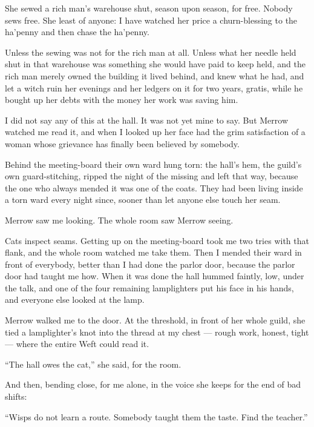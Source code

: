 She sewed a rich man's warehouse shut, season upon season, for free. Nobody sews free. She least of anyone: I have watched her price a churn-blessing to the ha'penny and then chase the ha'penny.

Unless the sewing was not for the rich man at all. Unless what her needle held shut in that warehouse was something she would have paid to keep held, and the rich man merely owned the building it lived behind, and knew what he had, and let a witch ruin her evenings and her ledgers on it for two years, gratis, while he bought up her debts with the money her work was saving him.

I did not say any of this at the hall. It was not yet mine to say. But Merrow watched me read it, and when I looked up her face had the grim satisfaction of a woman whose grievance has finally been believed by somebody.

Behind the meeting-board their own ward hung torn: the hall's hem, the guild's own guard-stitching, ripped the night of the missing and left that way, because the one who always mended it was one of the coats. They had been living inside a torn ward every night since, sooner than let anyone else touch her seam.

Merrow saw me looking. The whole room saw Merrow seeing.

Cats inspect seams. Getting up on the meeting-board took me two tries with that flank, and the whole room watched me take them. Then I mended their ward in front of everybody, better than I had done the parlor door, because the parlor door had taught me how. When it was done the hall hummed faintly, low, under the talk, and one of the four remaining lamplighters put his face in his hands, and everyone else looked at the lamp.

Merrow walked me to the door. At the threshold, in front of her whole guild, she tied a lamplighter's knot into the thread at my chest --- rough work, honest, tight --- where the entire Weft could read it.

``The hall owes the cat,'' she said, for the room.

And then, bending close, for me alone, in the voice she keeps for the end of bad shifts:

``Wisps do not learn a route. Somebody taught them the taste. Find the teacher.''
